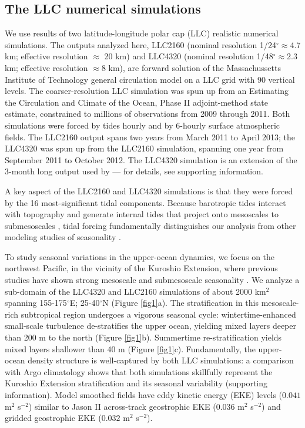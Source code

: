 \documentclass[grl]{agutex2015}
\begin{document}
\begin{article}
\section{The LLC numerical simulations}
We use results of two latitude-longitude polar cap (LLC)
realistic numerical simulations. The outputs
analyzed here, LLC2160 (nominal resolution 1/24$^\circ$$\approx$4.7 km;
effective resolution $\approx$ 20 km) and LLC4320
(nominal resolution 1/48$^\circ$$\approx$2.3 km;
effective resolution $\approx$8 km),   are
forward solution of the Massachussetts Institute of Technology general circulation model \citep[MITgcm; ][]{marshall_etal1997}
on a LLC grid  \citep{forget_etal2015} with
90 vertical levels. The coarser-resolution LLC simulation was
spun up from an Estimating the Circulation and Climate of the Ocean, Phase II \citep[ECCO2; ][]{menemenlis_etal2008}
adjoint-method state estimate, constrained to millions
of observations from 2009 through 2011. Both simulations were forced by
tides hourly and by 6-hourly surface atmospheric fields. The LLC2160
output spans two years from March 2011 to April 2013; the LLC4320 was spun up from
the LLC2160 simulation, spanning one year from September 2011 to October 2012.
The LLC4320 simulation is an extension of the 3-month long output used by
\citet{rocha_etal2016} --- for details, see supporting information.

A key aspect of the LLC2160 and LLC4320 simulations is that they were forced by
the 16 most-significant tidal components.
Because barotropic tides interact with topography and generate internal
tides that project onto mesoscales to submesoscales
\citep[e.g., ][]{rocha_etal2016}, tidal forcing fundamentally distinguishes our analysis
from other modeling studies of seasonality \citep{sasaki_etal2014,qiu_etal2014}.

To study seasonal variations in the upper-ocean dynamics, we focus on the northwest
Pacific, in the vicinity of the Kuroshio
Extension, where previous studies have shown strong mesoscale and submesoscale seasonality
\citep{sasaki_etal2014,qiu_etal2014}.
We analyze a sub-domain of the LLC4320 and LLC2160 simulations of about 2000 km$^2$
spanning 155-175$^\circ$E; 25-40$^\circ$N (Figure \ref{fig1}a). The stratification
in this mesoscale-rich subtropical region undergoes a vigorous seasonal cycle: wintertime-enhanced
small-scale turbulence de-stratifies the upper ocean, yielding mixed layers
deeper than 200 m to the north (Figure \ref{fig1}b). Summertime re-stratification yields mixed layers shallower
than 40 m (Figure \ref{fig1}c).
Fundamentally, the upper-ocean density structure is well-captured by both LLC simulations:
a comparison with Argo climatology shows that both simulations skillfully represent the Kuroshio
Extension stratification and its seasonal variability  (supporting information). Model smoothed
fields have eddy kinetic energy (EKE) levels ($0.041$ m$^2$ s$^{-2}$) similar to Jason II across-track
geostrophic EKE ($0.036$ m$^2$ s$^{-2}$) and gridded geostrophic EKE ($0.032$ m$^2$ s$^{-2}$).


\end{article}
\end{document}
